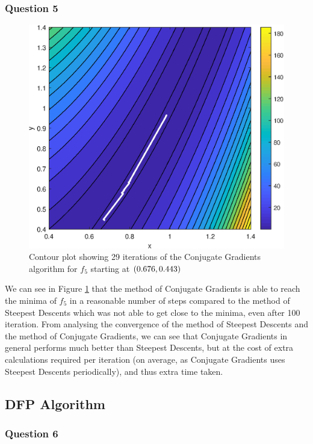 \documentclass[11pt]{article} %
\let\originalleft\left
\let\originalright\right
\renewcommand{\left}{\mathopen{}\mathclose\bgroup\originalleft}
\renewcommand{\right}{\aftergroup\egroup\originalright}
\begin{document}
\subsubsection*{Question 5}

\begin{figure}[!h]
	\centering
	\includegraphics{"../Matlab Files/contour6"}
	\caption{Contour plot showing 29 iterations of the Conjugate Gradients algorithm for $f_5$ starting at $\left(0.676, 0.443\right)$}
	\label{fig:CG_f5}
\end{figure}

We can see in Figure \ref{fig:CG_f5} that the method of Conjugate Gradients is able to reach the minima of $f_5$ in a reasonable number of steps compared to the method of Steepest Descents which was not able to get close to the minima, even after 100 iteration. From analysing the convergence of the method of Steepest Descents and the method of Conjugate Gradients, we can see that Conjugate Gradients in general performs much better than Steepest Descents, but at the cost of extra calculations required per iteration (on average, as Conjugate Gradients uses Steepest Descents periodically), and thus extra time taken.

\subsection*{DFP Algorithm}

\subsubsection*{Question 6}
\end{document}

